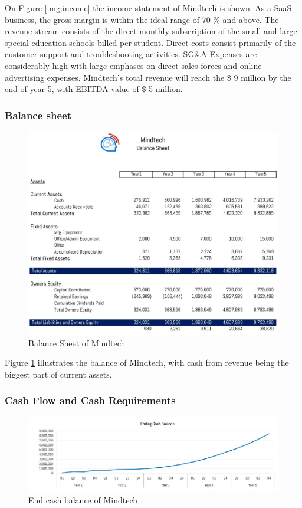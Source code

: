 \documentclass[letterpaper,10pt]{article}
\begin{document}
On Figure \ref{img:income} the income statement of Mindtech is shown. As a SaaS business, the gross margin is within the ideal range of 70 \% and above. The revenue stream consists of the direct monthly subscription of the small and large special education schools billed per student. Direct costs consist primarily of the customer support and troubleshooting activities. SG&A Expenses are considerably high with large emphases on direct sales forces and online advertising expenses. Mindtech's total revenue will reach the \$ 9 million by the end of year 5, with EBITDA value of \$ 5 million.

\subsubsection{Balance sheet}

\begin{figure}[!htb]
\centering
\includegraphics[scale=0.35]{balance.jpg}
\caption{Balance Sheet of Mindtech}
\label{img:balance}
\end{figure}

Figure \ref{img:balance} illustrates the balance of Mindtech, with cash from revenue being the biggest part of current assets. 

\subsubsection{Cash Flow and Cash Requirements}

\begin{figure}[!htb]
\centering
\includegraphics[scale=0.5]{endcf.jpg}
\caption{End cash balance of Mindtech}
\label{img:endcash}
\end{figure}
\end{document}
